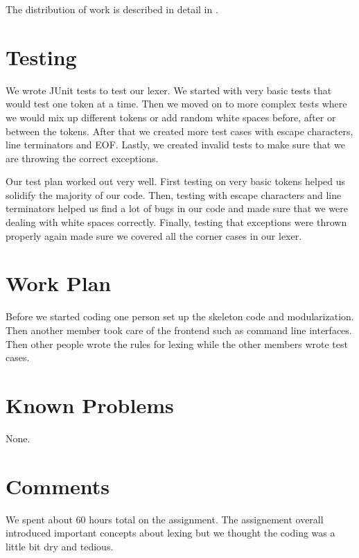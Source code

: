 \documentclass{hw}
\begin{document}
The distribution of work is described in detail in .

\section{Testing}\label{sec:testing}
We wrote JUnit tests to test our lexer. We started with very basic tests that
would test one token at a time. Then we moved on to more complex tests where
we would mix up different tokens or add random white spaces before, after or between the
tokens. After that we created more test cases with escape characters, line terminators
and EOF. Lastly, we created invalid tests to make sure that we are throwing the correct
exceptions.

Our test plan worked out very well. First testing on very basic tokens helped us solidify
the majority of our code. Then, testing with escape characters and line terminators helped
us find a lot of bugs in our code and made sure that we were dealing with white spaces correctly.
Finally, testing that exceptions were thrown properly again made sure we covered all the corner
cases in our lexer.
\section{Work Plan}\label{sec:workplan}
Before we started coding one person set up the skeleton code and modularization. Then another
member took care of the frontend such as command line interfaces. Then other people
wrote the rules for lexing while the other members wrote test cases.
\section{Known Problems}\label{sec:problems}
None.
\section{Comments}\label{sec:comments}
We spent about 60 hours total on the assignment. The assignement overall introduced
important concepts about lexing but we thought the coding was a little bit dry and tedious.
\end{document}
